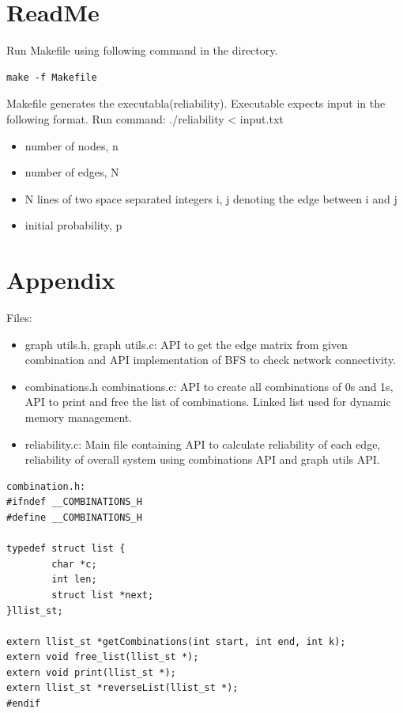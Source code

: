 \documentclass[11pt]{article}
\begin{document}
\section{ReadMe}
Run Makefile using following command in the directory.
\begin{lstlisting}
make -f Makefile
\end{lstlisting}
Makefile generates the executabla(reliability).
Executable expects input in the following format.
Run command: ./reliability < input.txt
\begin{itemize}
\item number of nodes, n
\item number of edges, N
\item N lines of two space separated integers i, j denoting the edge between i and j
\item initial probability, p
\end{itemize}
\section{Appendix}
Files:
\begin{itemize}
\item graph utils.h, graph utils.c: API to get the edge matrix from given combination and API implementation of BFS to check network connectivity.
\item combinations.h combinations.c: API to create all combinations of 0s and 1s, API to print and free the list of combinations. Linked list used for dynamic memory management.
\item reliability.c: Main file containing API to calculate reliability of each edge, reliability of overall system using combinations API and graph utils API.
\end{itemize}
\begin{lstlisting}
combination.h:
#ifndef __COMBINATIONS_H
#define __COMBINATIONS_H

typedef struct list {
        char *c;
        int len;
        struct list *next;
}llist_st;

extern llist_st *getCombinations(int start, int end, int k);
extern void free_list(llist_st *);
extern void print(llist_st *);
extern llist_st *reverseList(llist_st *);
#endif
\end{lstlisting}
\end{document}
